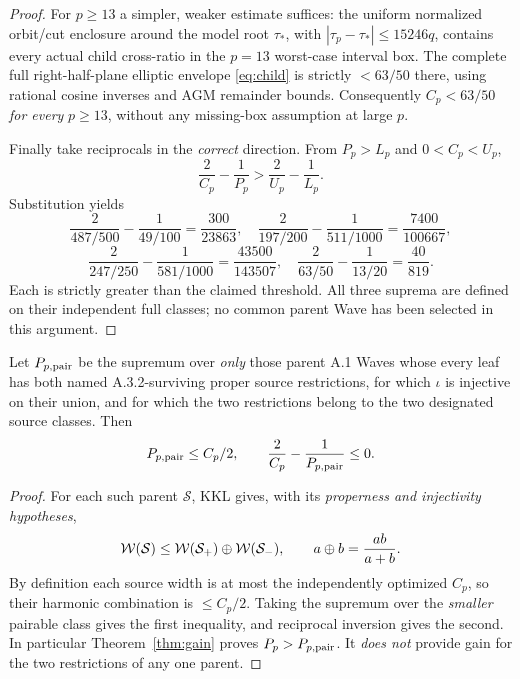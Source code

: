 \begin{proof}
For $p\ge13$ a simpler,
weaker estimate suffices:
the uniform normalized
orbit/cut enclosure
around the model root
$\tau_*$, with
$|\tau_p-\tau_*|\le15246q$,
contains every actual
child cross-ratio in
the $p=13$ worst-case
interval box.
The complete full
right-half-plane
elliptic envelope
\eqref{eq:child} is
strictly $<63/50$
there, using rational
cosine inverses and
AGM remainder bounds.
Consequently $C_p<63/50$
\emph{for every} $p\ge13$,
without any missing-box
assumption at large $p$.

Finally take reciprocals
in the \emph{correct}
direction.  From $P_p>L_p$
and $0<C_p<U_p$,
\[
 \frac2{C_p}-\frac1{P_p}>
 \frac2{U_p}-\frac1{L_p}.
\]
Substitution yields
\[
 \frac2{487/500}-\frac1{49/100}
  =\frac{300}{23863},\quad
 \frac2{197/200}-\frac1{511/1000}
  =\frac{7400}{100667},
\]
\[
 \frac2{247/250}-\frac1{581/1000}
  =\frac{43500}{143507},\quad
 \frac2{63/50}-\frac1{13/20}=\frac{40}{819}.
\]
Each is strictly greater than the
claimed threshold.  All three
suprema are defined on their
independent full classes;
no common parent Wave has
been selected in this argument.
\end{proof}

\begin{proposition}
\label{prop:loss}
Let $P_{p,\mathrm{pair}}$ be the
supremum over \emph{only}
those parent A.1 Waves
whose every leaf has both
named A.3.2-surviving
proper source restrictions,
for which $\iota$ is injective
on their union, and for
which the two restrictions
belong to the two
designated source classes.
Then
\[
 P_{p,\mathrm{pair}}\le C_p/2,\qquad
 \frac2{C_p}-\frac1{P_{p,\mathrm{pair}}}\le0.
\]
\end{proposition}
\begin{proof}
For each such parent
$\mathcal S$, KKL
\cite[Lemma A.11 and
Proposition A.12]{KKL2026}
gives, with its
\emph{properness and
injectivity hypotheses},
\[
 \mathcal W(\mathcal S)\le
 \mathcal W(\mathcal S_+)\oplus\mathcal W(\mathcal S_-),
 \qquad a\oplus b=\frac{ab}{a+b}.
\]
By definition each
source width is at most
the independently optimized
$C_p$, so their harmonic
combination is $\le C_p/2$.
Taking the supremum over
the \emph{smaller}
pairable class gives
the first inequality,
and reciprocal inversion
gives the second.
In particular
Theorem~\ref{thm:gain}
proves $P_p>P_{p,\mathrm{pair}}$.
It \emph{does not}
provide gain for
the two restrictions
of any one parent.
\end{proof}
